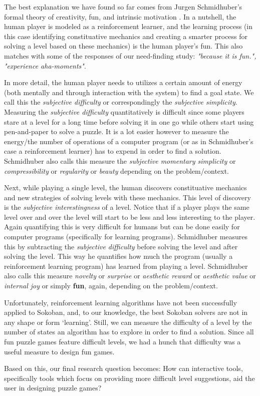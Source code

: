 The best explanation we have found so far comes from Jurgen Schmidhuber's formal theory of creativity, fun, and intrinsic motivation \cite{Schmidhuber}. In a nutshell, the human player is modeled as a reinforcement learner, and the learning process (in this case identifying constituative mechanics and creating a smarter process for solving a level based on these mechanics) is the human player's fun. This also matches with some of the responses of our need-finding study: \textit{"because it is fun.", "experience aha-moments"}.

In more detail, the human player needs to utilizes a certain amount of energy (both mentally and through interaction with the system) to find a goal state. We call this the \textit{subjective difficulty} or correspondingly the \textit{subjective simplicity}. Measuring the \textit{subjective difficulty} quantitatively is difficult since some players stare at a level for a long time before solving it in one go while others start using pen-and-paper to solve a puzzle. It is a lot easier however to measure the energy/the number of operations of a computer program (or as in Schmidhuber's case a reinforcement learner) has to expend in order to find a solution. Schmidhuber also calls this measure the \textit{subjective momentary simplicity} or \textit{compressibility} or \textit{regularity} or \textit{beauty} depending on the problem/context.

Next, while playing a single level, the human discovers constituative mechanics and new strategies of solving levels with these mechanics. This level of discovery is the \textit{subjective interestingness} of a level. Notice that if a player plays the same level over and over the level will start to be less and less interesting to the player. Again quantifying this is very difficult for humans but can be done easily for computer programs (specifically for learning programs). Schmidhuber measures this by subtracting the \textit{subjective difficulty} before solving the level and after solving the level. This way he quantifies how much the program (usually a reinforcement learning program) has learned from playing a level. Schmidhuber also calls this measure \textit{novelty} or \textit{surprise} or \textit{aesthetic reward} or \textit{aesthetic value} or \textit{internal joy} or simply \textbf{fun}, again, depending on the problem/context.

Unfortunately, reinforcement learning algorithms have not been successfully applied to Sokoban, and, to our knowledge, the best Sokoban solvers are not in any shape or form `learning'. Still, we can measure the difficulty of a level by the number of states an algorithm has to explore in order to find a solution.
Since all fun puzzle games feature difficult levels, we had a hunch that difficulty was a useful measure to design fun games. 

Based on this, our final research question becomes: How can interactive tools, specifically tools which focus on providing more difficult level suggestions, aid the user in designing puzzle games?